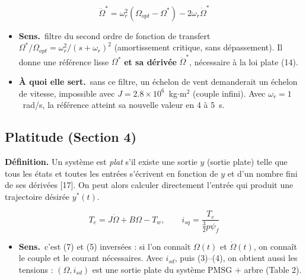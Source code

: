 \documentclass[11pt,a4paper]{article}
\newenvironment{expl}{\begin{itemize}[leftmargin=1.2em,itemsep=2pt,topsep=2pt]}{\end{itemize}}
\newcommand{\sens}{\item \textbf{Sens.}~}
\newcommand{\role}{\item \textbf{À quoi elle sert.}~}
\begin{document}
\begin{equation}\tag{12}
\ddot\Omega^*=\omega_r^2(\Omega_{opt}-\Omega^*)-2\omega_r\dot\Omega^*
\end{equation}
\begin{expl}
\sens filtre du second ordre de fonction de transfert $\Omega^*/\Omega_{opt}=\omega_r^2/(s+\omega_r)^2$
(amortissement critique, sans dépassement). Il donne une référence lisse $\Omega^*$ \textbf{et sa dérivée}
$\dot\Omega^*$, nécessaire à la loi plate (14).
\role sans ce filtre, un échelon de vent demanderait un échelon de vitesse, impossible avec
$J=2.8\times10^6$~kg$\cdot$m$^2$ (couple infini). Avec $\omega_r=1$~rad/s, la référence atteint sa nouvelle
valeur en 4 à 5~s.
\end{expl}

\subsection{Platitude (Section 4)}
\textbf{Définition.} Un système est \emph{plat} s'il existe une sortie $y$ (sortie plate) telle que tous les
états et toutes les entrées s'écrivent en fonction de $y$ et d'un nombre fini de ses dérivées [17]. On
peut alors calculer directement l'entrée qui produit une trajectoire désirée $y^*(t)$.

\begin{equation}\tag{13}
T_e=J\dot\Omega+B\Omega-T_w,\qquad i_{sq}=\frac{T_e}{\frac32p\psi_f}
\end{equation}
\begin{expl}
\sens c'est (7) et (5) inversées : si l'on connaît $\Omega(t)$ et $\dot\Omega(t)$, on connaît le couple et le
courant nécessaires. Avec $i_{sd}$, puis (3)--(4), on obtient aussi les tensions : $(\Omega,i_{sd})$ est une
sortie plate du système PMSG $+$ arbre (Table 2).
\end{expl}
\end{document}
